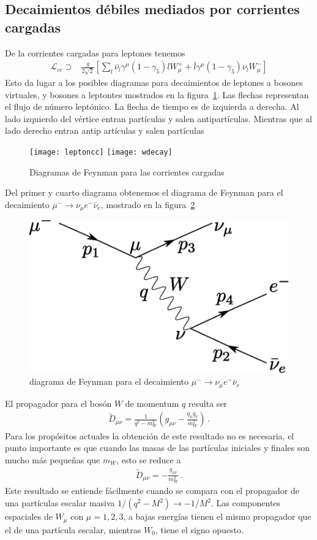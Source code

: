 \subsection{Decaimientos débiles mediados por corrientes cargadas}
De la corrientes cargadas para leptones tenemos
\begin{align}
  \mathcal{L}_{cc}\supset&\frac{g}{2\sqrt{2}}\left[\sum_l\bar{\nu_l}\gamma^\mu(1-\gamma_5)l W_\mu^++\bar{l}\gamma^\mu(1-\gamma_5)\nu_l W_\mu^-\right]
\end{align}
Esto da lugar a los posibles diagramas para decaimientos de leptones a bosones virtuales, y bosones a leptontes mostrados en la figura~\ref{fig:leptoncc}. Las flechas representan el flujo de número leptónico. La flecha de tiempo es de izquierda a derecha. Al lado izquierdo del vértice entran partículas y salen antipartículas. Mientras que al lado derecho entran antip artículas y salen partículas
\begin{figure}
  \centering
  \texttt{[image: leptoncc]}
\qquad  \texttt{[image: wdecay]}

  \caption{Diagramas de Feynman para las corrientes cargadas}
  \label{fig:leptoncc}
\end{figure}
Del primer y cuarto diagrama obtenemos el diagrama de Feynman para el decaimiento $\mu^-\to \nu_\mu e^-\bar{\nu}_e$, mostrado en la figura~\ref{fig:muondecay}
\begin{figure}
  \centering
  \includegraphics[scale=0.5]{muon_decay}
  \caption{diagrama de Feynman para el decaimiento $\mu^-\to \nu_\mu e^-\bar{\nu}_e$}
  \label{fig:muondecay}
\end{figure}
El propagador para el bosón $W$ de momentum $q$ resulta ser
\begin{align}
  \widetilde{D}_{\mu\nu}=\frac{1}{q^2-m_W^2}\left(g_{\mu\nu}-\frac{q_\mu q_\nu}{m_W^2}\right)\,.
\end{align}
Para los propósitos actuales la obtención de este resultado no es necesaria, el punto importante es que cuando las masas de las partículas iniciales y finales son mucho más pequeñas que $m_W$, esto se reduce a
\begin{align}
  \widetilde{D}_{\mu\nu}=-\frac{g_{\mu\nu}}{m_W^2}\,.
\end{align}
Este resultado se entiende fácilmente cuando se compara con el propagador de una partículas escalar masiva $1/(q^2-M^2)\to-1/M^2$. Las componentes espaciales de $W_\mu$ con $\mu=1,2,3$, a bajas energías tienen el mismo propagador que el de una partícula escalar, mientras $W_0$, tiene el signo opuesto.

